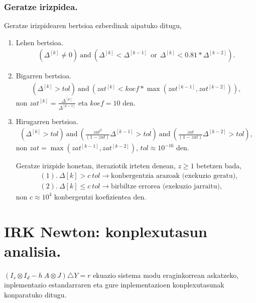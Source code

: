 \subsubsection*{Geratze irizpidea.}

Geratze irizpidearen bertsioa ezberdinak aipatuko ditugu,

\begin{enumerate}
\item Lehen bertsioa.
\begin{align*}
(\Delta^{[k]} \neq 0) \ \text{and} \ ( \Delta^{[k]}< \Delta^{[k-1]} \ \ \text{or} \ \ \Delta^{[k]}< 0.81*\Delta^{[k-2]}).
\end{align*}

\item Bigarren bertsioa.
\begin{align*}
\left(\Delta^{[k]} > tol \right) \ \text{and} \ \left( zat^{[k]}  < koef*\max(zat^{[k-1]},zat^{[k-2]}) \right),
\end{align*}
non $zat^{[k]}=\frac{\Delta^{[k]}}{\Delta^{[k-1]}}$ eta $koef=10$ den.

\item Hirugarren bertsioa.
\begin{align*}
\left(\Delta^{[k]} > tol\right) \ \text{and} \ \left(\frac{zat^2}{(1-zat)} \Delta^{[k-1]}>tol\right) \ \text{and} \ \left(\frac{zat}{(1-zat)}\Delta^{[k-2]}>tol\right),
\end{align*}
non $zat=\max(zat^{[k-1]},zat^{[k-2]})$, $tol\approx10^{-16}$ den.

Geratze irizpide honetan, iteraziotik irteten denean, $z\geqslant1$ betetzen bada,
\begin{align*}
&(1). \ \Delta {[k]} > c \ tol \rightarrow \text{konbergentzia arazoak (exekuzio geratu)},\\
&(2). \ \Delta {[k]} \leqslant c \ tol \rightarrow \text{birbiltze errorea (exekuzio jarraitu)},
\end{align*}   
non $c\approx 10^{4}$ konbergentzi koefizientea den. 
\end{enumerate}

 
\section{IRK Newton: konplexutasun analisia.}

$(I_s \otimes I_d - h \ A \otimes J) \triangle Y = r$ ekuazio sistema modu eraginkorrean askatzeko, inplementazio estandarraren eta gure inplementazioen konplexutasunak konparatuko ditugu.

